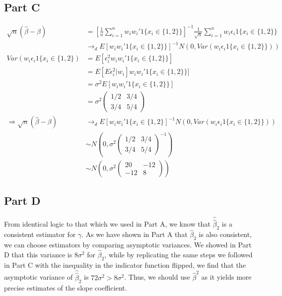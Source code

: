 \documentclass[11pt]{article} %
\begin{document}
\subsection{Part C}
\begin{align*}
\sqrt{n}(\hat{\beta} - \beta) &=  \left[\frac{1}{n} \sum_{i=1}^n w_i w_i' 1\{ x_i \in \{1,2\} \} \right]^{-1}\frac{1}{\sqrt{n}}\sum_{i=1}^n w_i \epsilon_i 1\{ x_i \in \{1,2\}\}\\
&\rightarrow_d E[w_i w_i' 1\{ x_i \in \{1,2\} \} ]^{-1}N(0,Var(w_i\epsilon_i 1\{ x_i \in \{1,2\} \}))\\
Var(w_i\epsilon_i 1\{ x_i \in \{1,2\} )&= E[\epsilon_i^2w_i w_i'1\{ x_i \in \{1,2\} \}]\\
&=  E[E\epsilon_i^2|w_i] w_i w_i' 1\{ x_i \in \{1,2\} \}]\\
&= \sigma^2E[w_i w_i' 1\{ x_i \in \{1,2\} \}]\\
&= \sigma^2\begin{pmatrix}1/2 & 3/4 \\ 3/4 & 5/4 \end{pmatrix}\\
\Rightarrow \sqrt{n}(\hat{\beta} - \beta) &\rightarrow_d E[w_i w_i' 1\{ x_i \in \{1,2\}  ]^{-1}N(0,Var(w_i\epsilon_i 1\{ x_i \in \{1,2\} \}))\\
&\sim N\left(0,\sigma^2\begin{pmatrix}1/2 & 3/4 \\ 3/4 & 5/4 \end{pmatrix}^{-1}\right)\\
&\sim N\left(0,\sigma^2\begin{pmatrix} 20 & -12 \\ -12 & 8 \end{pmatrix}\right)
\end{align*}
\subsection{Part D}
From identical logic to that which we used in Part A, we know that $\hat{\hat{\beta}}_2 $ is a consistent estimator for $\gamma$. As we have shown in Part A that $\hat{\beta}_2$ is also consistent, we can choose estimators by comparing asymptotic variances. We showed in Part D that this variance is $8\sigma^2$ for $\hat{\beta}_2$, while by replicating the same steps we followed in Part C with the inequality in the indicator function flipped, we find that the asymptotic variance of $\hat{\hat{\beta}}_2$ is $ 72\sigma^2>8\sigma^2$. Thus, we should use $\hat{\beta}^2$ as it yields more precise estimates of the slope coefficient.
\end{document}
